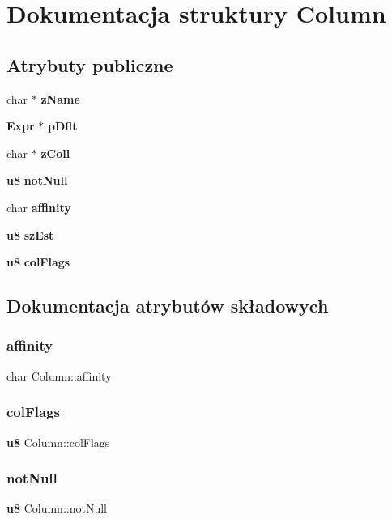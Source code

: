 \section{Dokumentacja struktury Column}
\label{struct_column}
\subsection*{Atrybuty publiczne}
\begin{DoxyCompactItemize}
\item 
char $\ast$ \textbf{ z\+Name}
\item 
\textbf{ Expr} $\ast$ \textbf{ p\+Dflt}
\item 
char $\ast$ \textbf{ z\+Coll}
\item 
\textbf{ u8} \textbf{ not\+Null}
\item 
char \textbf{ affinity}
\item 
\textbf{ u8} \textbf{ sz\+Est}
\item 
\textbf{ u8} \textbf{ col\+Flags}
\end{DoxyCompactItemize}


\subsection{Dokumentacja atrybutów składowych}
\mbox{\label{struct_column_ac9d6fe31c45888cecaf3f5ad5b93bf23}} 
\subsubsection{affinity}
{\footnotesize\ttfamily char Column\+::affinity}

\mbox{\label{struct_column_aadfed8f7a238c314e1499a6c4090f920}} 
\subsubsection{colFlags}
{\footnotesize\ttfamily \textbf{ u8} Column\+::col\+Flags}

\mbox{\label{struct_column_a852e9a4c1c327a64d9b051dcafda3841}} 
\subsubsection{notNull}
{\footnotesize\ttfamily \textbf{ u8} Column\+::not\+Null}


